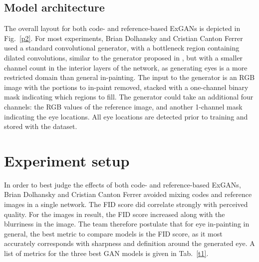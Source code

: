 \documentclass[10pt,twocolumn,letterpaper]{article}
\begin{document}
\subsection{Model architecture}

The overall layout for both code- and reference-based ExGANs is depicted in Fig.~\ref{p2}. For most experiments, Brian Dolhansky and Cristian Canton Ferrer used a standard convolutional generator, with a bottleneck region containing dilated convolutions, similar to the generator proposed in \cite{Ishikawa2017Globally}, but with a smaller channel count in the interior layers of the network, as generating eyes is a more restricted domain than general in-painting. The input to the generator is an RGB image with the portions to in-paint removed, stacked with a one-channel binary mask indicating which regions to fill. The generator could take an additional four channels: the RGB values of the reference image, and another 1-channel mask indicating the eye locations. All eye locations are detected prior to training and stored with the dataset.

\section{Experiment setup}

In order to best judge the effects of both code- and reference-based ExGANs, Brian Dolhansky and Cristian Canton Ferrer avoided mixing codes and reference images in a single network. The FID score did correlate strongly with perceived quality. For the images in result, the FID score increased along with the blurriness in the image. The team therefore postulate that for eye in-painting in general, the best metric to compare models is the FID score, as it most accurately corresponds with sharpness and definition around the generated eye. A list of metrics for the three best GAN models is given in Tab.~\ref{t1}.

{\small


}
\end{document}
